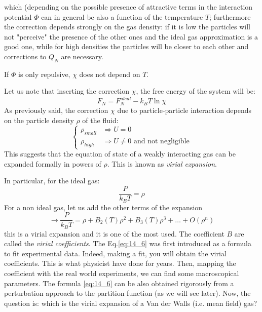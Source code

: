 \documentclass[../../Main/Main.tex]{subfiles}
\begin{document}
which (depending on the possible presence of attractive terms in the interaction potential \( \Phi  \) can in general be also a function of the temperature \( T \);
furthermore the correction depends strongly on the gas density: if it is low the particles will not "perceive" the presence of the other ones and the ideal gas approximation is a good one, while for high densities the particles will be closer to each other and corrections to \( Q_N \) are necessary.
\begin{remark}
If \( \Phi  \) is only repulsive, \( \chi  \) does not depend on \( T \).
\end{remark}
Let us note that inserting the correction \( \chi  \), the free energy of the system will be:
\begin{equation}
  F_N = F_N^{ideal} - k_B T \ln{\chi }
\end{equation}
As previously said, the correction \( \chi  \) due to particle-particle interaction depends on the particle density \( \rho  \) of the fluid:
\begin{equation}
  \begin{cases}
   \rho _{small} &\Rightarrow  U = 0 \\
   \rho _{high} &\Rightarrow  U \neq 0 \text{ and not negligible}
  \end{cases}
\end{equation}
This suggests that the equation of state of a weakly interacting gas can be expanded formally in powers of \( \rho  \). This is known as \emph{virial expansion}.

In particular, for the ideal gas:
\begin{equation*}
  \frac{P}{k_B T} = \rho
\end{equation*}
For a non ideal gas, let us add the other terms of the expansion
\begin{equation}
  \rightarrow \frac{P}{k_B T} = \rho + B_2 (T) \rho ^2 + B_3 (T)\rho ^3+ \dots + O(\rho ^n)
  \label{eq:14_6}
\end{equation}
this is a virial expansion and it is one of the most used. The coefficient \( B \) are called the \emph{virial coefficients}.
The Eq.\eqref{eq:14_6} was first introduced as a formula to fit experimental data. Indeed, making a fit, you will obtain the virial coefficients. This is what physicist have done for years.  Then, mapping the coefficient with the real world experiments, we can find some macroscopical parameters.
The formula \eqref{eq:14_6} can be also obtained rigorously from a perturbation approach to the partition function (as we will see later). Now, the question is: which is the virial expansion of a Van der Walls (i.e. mean field) gas?
\end{document}
